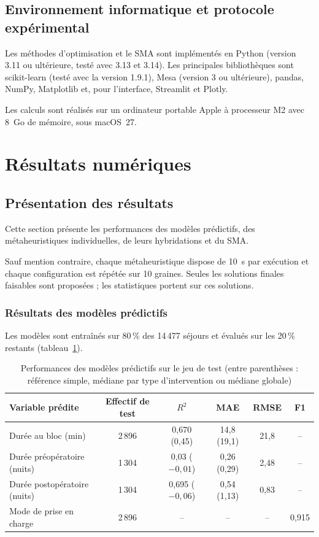 \documentclass[11pt,a4paper]{article}
\begin{document}
\subsection{Environnement informatique et protocole expérimental}

Les méthodes d'optimisation et le SMA sont implémentés en Python (version 3.11 ou ultérieure, testé avec 3.13 et 3.14). Les principales bibliothèques sont scikit-learn (testé avec la version 1.9.1), Mesa (version 3 ou ultérieure), pandas, NumPy, Matplotlib et, pour l'interface, Streamlit et Plotly.

Les calculs sont réalisés sur un ordinateur portable Apple à processeur M2 avec 8~Go de mémoire, sous macOS~27.


\section{Résultats numériques}
\label{sec:results}

\subsection{Présentation des résultats}

Cette section présente les performances des modèles prédictifs,
des métaheuristiques individuelles, de leurs hybridations
et du SMA.

Sauf mention contraire, chaque métaheuristique dispose de 10~s par exécution et chaque configuration est répétée sur 10 graines. Seules les solutions finales faisables sont proposées ; les statistiques portent sur ces solutions.

\subsubsection{Résultats des modèles prédictifs}

Les modèles sont entraînés sur 80\,\% des 14\,477 séjours et évalués sur les 20\,\% restants (tableau~\ref{tab:ml_results}).

\begin{table}[htbp]
\centering
\caption{Performances des modèles prédictifs sur le jeu de test (entre parenthèses : référence simple, médiane par type d'intervention ou médiane globale)}
\label{tab:ml_results}
\small
\begin{tabular}{lccccc}
\toprule
\textbf{Variable prédite} & \textbf{Effectif de test} & \textbf{$R^2$} & \textbf{MAE} & \textbf{RMSE} & \textbf{F1} \\
\midrule
Durée au bloc (min) & 2\,896 & 0,670 (0,45) & 14,8 (19,1) & 21,8 & -- \\
Durée préopératoire (nuits) & 1\,304 & 0,03 ($-0{,}01$) & 0,26 (0,29) & 2,48 & -- \\
Durée postopératoire (nuits) & 1\,304 & 0,695 ($-0{,}06$) & 0,54 (1,13) & 0,83 & -- \\
Mode de prise en charge & 2\,896 & -- & -- & -- & 0,915 \\
\bottomrule
\end{tabular}
\end{table}
\end{document}
